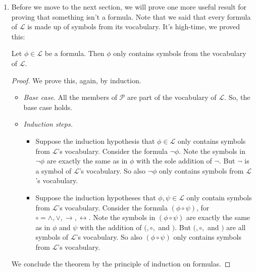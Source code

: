 \begin{enumerate}[\thesection.1]
	\item Before we move to the next section, we will prove one more useful result for proving that something isn't a formula. Note that we said that every formula of $\mathcal{L}$ is made up of symbols from its vocabulary. It's high-time, we proved this:
	\begin{proposition}
	Let $\phi\in\mathcal{L}$ be a formula. Then $\phi$ only contains symbols from the vocabulary of $\mathcal{L}$.
	\end{proposition}	
		\begin{proof}
		We prove this, again, by induction.
		
		\begin{itemize}
	
		\item \emph{Base case}. All the members of $\mathcal{P}$ are part of the vocabulary of $\mathcal{L}$. So, the base case holds.
		
		\item \emph{Induction steps.}
		
		\begin{itemize}
		
			\item Suppose the induction hypothesis that $\phi\in\mathcal{L}$ only contains symbols from $\mathcal{L}$'s vocabulary. Consider the formula $\neg\phi$. Note the symbols in $\neg\phi$ are exactly the same as in $\phi$ with the sole addition of $\neg$. But $\neg$ is a symbol of $\mathcal{L}$'s vocabulary. So also $\neg\phi$ only contains symbols from $\mathcal{L}$'s vocabulary.
			
			\item Suppose the induction hypotheses that $\phi,\psi\in\mathcal{L}$ only contain symbols from $\mathcal{L}$'s vocabulary. Consider the formula $(\phi\circ\psi)$, for $\circ=\land,\lor,\to,\leftrightarrow$. Note the symbols in $(\phi\circ\psi)$ are exactly the same as in $\phi$ and $\psi$ with the  addition of $(,\circ,$ and $)$. But  $(,\circ,$ and $)$ are all symbols of $\mathcal{L}$'s vocabulary. So also $(\phi\circ\psi)$ only contains symbols from $\mathcal{L}$'s vocabulary.
		
		\end{itemize}
	
	\end{itemize}
	
	We conclude the theorem by the principle of induction on formulas.
		
		\end{proof}	
			

\end{enumerate}
